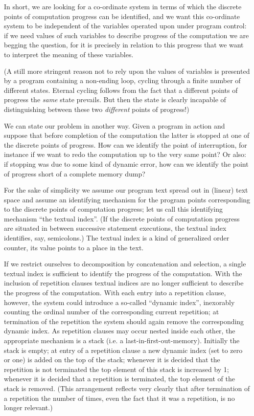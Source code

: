 \documentclass[twoside,11pt]{book}
\begin{document}
In short, we are looking for a co-ordinate system in terms of which the discrete points of computation progress can be identified, and we want this co-ordinate system to be independent of the variables operated upon under program control: if we need values of such variables to describe progress of the computation we are begging the question, for it is precisely in relation to this progress that we want to interpret the meaning of these variables.

(A still more stringent reason not to rely upon the values of variables is presented by a program containing a non-ending loop, cycling through a finite number of different states. Eternal cycling follows from the fact that a different points of progress the \textit{same} state prevails. But then the state is clearly incapable of distinguishing between these two \textit{different} points of progress!)

We can state our problem in another way. Given a program in action and suppose that before completion of the computation the latter is stopped at one of the discrete points of progress. How can we identify the point of interruption, for instance if we want to redo the computation up to the very same point? Or also: if stopping was due to some kind of dynamic error, how can we identify the point of progress short of a complete memory dump?

For the sake of simplicity we assume our program text spread out in (linear) text space and assume an identifying mechanism for the program points corresponding to the discrete points of computation progress; let us call this identifying mechanism ``the textual index''. (If the discrete points of computation progress are situated in between successive statement executions, the textual index identifies, say, semicolons.) The textual index is a kind of generalized order counter, its value points to a place in the text.

If we restrict ourselves to decomposition by concatenation and selection, a single textual index is sufficient to identify the progress of the computation. With the inclusion of repetition clauses textual indices are no longer sufficient to describe the progress of the computation. With each entry into a repetition clause, however, the system could introduce a so-called ``dynamic index'', inexorably counting the ordinal number of the corresponding current repetition; at termination of the repetition the system should again remove the corresponding dynamic index. As repetition clauses may occur nested inside each other, the appropriate mechanism is a stack (i.e. a last-in-first-out-memory). Initially the stack is empty; at entry of a repetition clause a new dynamic index (set to zero or one) is added on the top of the stack; whenever it is decided that the repetition is not terminated the top element of this stack is increased by 1; whenever it is decided that a repetition is terminated, the top element of the stack is removed. (This arrangement reflects very clearly that after termination of a repetition the number of times, even the fact that it was a repetition, is no longer relevant.)
\end{document}
